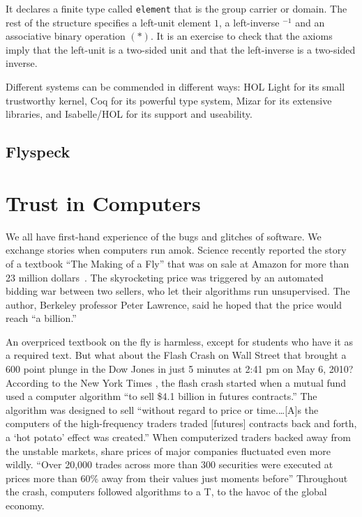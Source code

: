 \documentclass{llncs}
\begin{document}
\smallskip

It declares a finite type called {\tt element} that is the group carrier or domain.
The rest of the structure specifies a left-unit element $1$, 
a left-inverse ${}^{-1}$ and an associative binary operation $( * )$. 
It is an exercise to check that the axioms imply that the left-unit is a two-sided
unit and that the left-inverse is a two-sided inverse.




\bigskip

Different systems can be commended in different ways: HOL Light for
its small trustworthy kernel, Coq for its powerful type system, Mizar
for its extensive libraries, and Isabelle/HOL for its support and useability.



\subsection{Flyspeck}


\section{Trust in Computers}

We all have first-hand experience of the bugs and glitches of
software.  We exchange stories when computers run amok.  Science
recently reported the story of a textbook ``The Making of a Fly'' that
was on sale at Amazon for more than 23 million dollars~\cite{Sci11}.  The
skyrocketing price was triggered by an automated bidding war between
two sellers, who let their algorithms run unsupervised.  The author,
Berkeley professor Peter Lawrence, said he hoped that the price would
reach ``a billion.''


An overpriced textbook on the fly is harmless, except for students who
have it as a required text.  But what about the Flash Crash on Wall
Street that brought a 600 point plunge in the Dow Jones in just 5
minutes at 2:41 pm on May 6, 2010?  According to the New York Times \cite{NYT2010}, the flash
crash started when a mutual fund used a computer algorithm ``to sell
\$4.1 billion in futures contracts.''  The algorithm was designed to
sell ``without regard to price or time.\dots [A]s the computers of the
high-frequency traders traded [futures] contracts back and forth, a
`hot potato' effect was created.''  When computerized traders backed
away from the unstable markets, share prices of major companies
fluctuated even more wildly. ``Over 20,000 trades across more than 300
securities were executed at prices more than 60\% away from their
values just moments before'' \cite{SEC2010} Throughout the crash,
computers followed algorithms to a T, to the havoc
of the global economy. 
\end{document}

